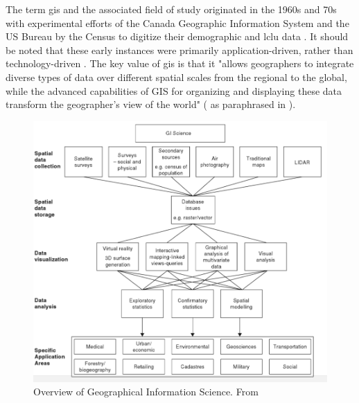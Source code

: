 The term \ac{gis} and the associated field of study originated in the 1960s and 70s with experimental efforts of the Canada Geographic Information System and the US Bureau by the Census to digitize their demographic and \ac{lclu} data \cite{goodchildGeographicInformationSystems1994}. It should be noted that these early instances were primarily application-driven, rather than technology-driven \cite{goodchildGeographicalInformationScience1992}. The key value of \ac{gis} is that it "allows geographers to integrate diverse types of data over different spatial scales from the regional to the global, while the advanced capabilities of GIS for organizing and displaying these data transform the geographer's view of the world" (\cite{tomlinsonPRESIDENTIALADDRESSGEOGRAPHIC1989} as paraphrased in \cite{vereginComputerInnovationAdoption1994}).

\begin{figure}[!htb]
	\centering
	\includegraphics[scale=0.4]{Figures/chap2/GIScience.png}
	\caption[Overview of Geographical Information Science]{Overview of Geographical Information Science. From \cite{fotheringhamGeographicInformationScience2007}}
	\label{fig:giscience}
\end{figure}

